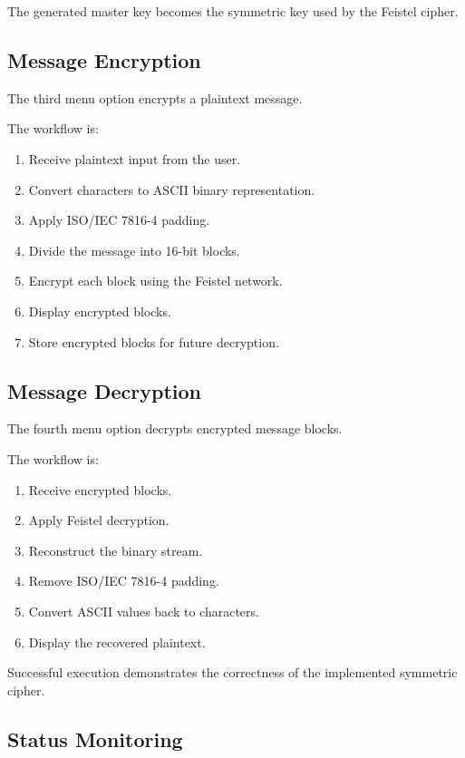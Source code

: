 \documentclass[12pt]{article}
\begin{document}
The generated master key becomes the symmetric key used by the Feistel cipher.

\subsection{Message Encryption}

The third menu option encrypts a plaintext message.

The workflow is:

\begin{enumerate}
\item Receive plaintext input from the user.
\item Convert characters to ASCII binary representation.
\item Apply ISO/IEC 7816-4 padding.
\item Divide the message into 16-bit blocks.
\item Encrypt each block using the Feistel network.
\item Display encrypted blocks.
\item Store encrypted blocks for future decryption.
\end{enumerate}

\subsection{Message Decryption}

The fourth menu option decrypts encrypted message blocks.

The workflow is:

\begin{enumerate}
\item Receive encrypted blocks.
\item Apply Feistel decryption.
\item Reconstruct the binary stream.
\item Remove ISO/IEC 7816-4 padding.
\item Convert ASCII values back to characters.
\item Display the recovered plaintext.
\end{enumerate}

Successful execution demonstrates the correctness of the implemented symmetric cipher.

\subsection{Status Monitoring}
\end{document}

